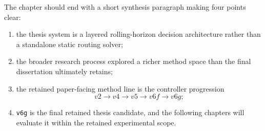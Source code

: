 The chapter should end with a short synthesis paragraph making four points clear:
\begin{enumerate}
    \item the thesis system is a layered rolling-horizon decision architecture rather than a standalone static routing solver;
    \item the broader research process explored a richer method space than the final dissertation ultimately retains;
    \item the retained paper-facing method line is the controller progression
    \[
        v2 \rightarrow v4 \rightarrow v5 \rightarrow v6f \rightarrow v6g;
    \]
    \item \texttt{v6g} is the final retained thesis candidate, and the following chapters will evaluate it within the retained experimental scope.
\end{enumerate}

